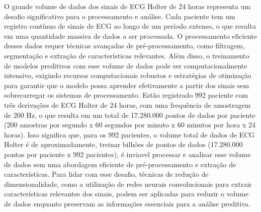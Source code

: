 O grande volume de dados dos sinais de ECG Holter de 24 horas representa um desafio significativo para o processamento e análise. Cada paciente tem um registro contínuo de sinais de ECG ao longo de um período extenso, o que resulta em uma quantidade massiva de dados a ser processada. O processamento eficiente desses dados requer técnicas avançadas de pré-processamento, como filtragem, segmentação e extração de características relevantes. Além disso, o treinamento de modelos preditivos com esse volume de dados pode ser computacionalmente intensivo, exigindo recursos computacionais robustos e estratégias de otimização para garantir que o modelo possa aprender efetivamente a partir dos sinais sem sobrecarregar os sistemas de processamento. Estão registrado 992 paciente com três derivações de ECG Holter de 24 horas, com uma frequência de amostragem de 200 \gls{Hz}, o que resulta em um total de 17.280.000 pontos de dados por paciente (200 amostras por segundo x 60 segundos por minuto x 60 minutos por hora x 24 horas). Isso significa que, para os 992 pacientes, o volume total de dados de ECG Holter é de aproximadamente, treinar bilhões de pontos de dados (17.280.000 pontos por paciente x 992 pacientes), é inviavel processar e analisar esse volume de dados sem uma abordagem eficiente de pré-processamento e extração de características. Para lidar com esse desafio, técnicas de redução de dimensionalidade, como a utilização de redes neurais convolucionais para extrair características relevantes dos sinais, podem ser aplicadas para reduzir o volume de dados enquanto preservam as informações essenciais para a análise preditiva.










